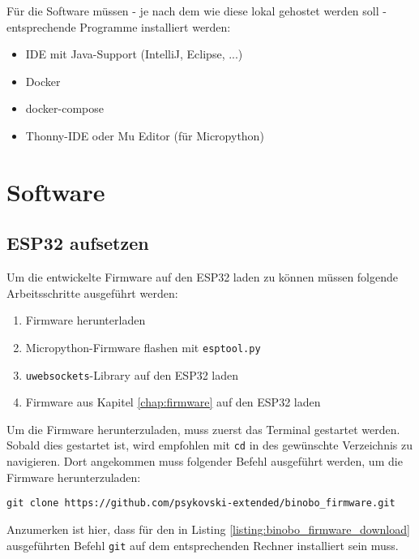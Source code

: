 \documentclass[paper=a4,12pt]{scrreprt}
\begin{document}
Für die Software müssen - je nach dem wie diese lokal gehostet werden soll - entsprechende Programme installiert werden:\newline

\begin{itemize}
  \item IDE mit Java-Support (IntelliJ, Eclipse, ...)
  \item Docker
  \item docker-compose
  \item Thonny-IDE oder Mu Editor (für Micropython)
\end{itemize}

\section{Software}

\subsection{ESP32 aufsetzen}

Um die entwickelte Firmware auf den ESP32 laden zu können müssen folgende Arbeitsschritte ausgeführt werden:\newline
\begin{enumerate}
  \item Firmware herunterladen
  \item Micropython-Firmware flashen mit \texttt{esptool.py}
  \item \texttt{uwebsockets}-Library auf den ESP32 laden
  \item Firmware aus Kapitel \ref{chap:firmware} auf den ESP32 laden
\end{enumerate}

Um die Firmware herunterzuladen, muss zuerst das Terminal gestartet werden. Sobald dies gestartet ist, wird empfohlen mit \texttt{cd} in des gewünschte Verzeichnis zu navigieren. Dort angekommen muss folgender Befehl ausgeführt werden, um die Firmware herunterzuladen:\newline

\begin{lstlisting}[caption={Firmware herunterladen mithilfe von git}, captionpos=b, label={listing:binobo_firmware_download}]
  git clone https://github.com/psykovski-extended/binobo_firmware.git
\end{lstlisting}

Anzumerken ist hier, dass für den in Listing \ref{listing:binobo_firmware_download} ausgeführten Befehl \texttt{git} auf dem entsprechenden Rechner installiert sein muss.\newline
\end{document}
